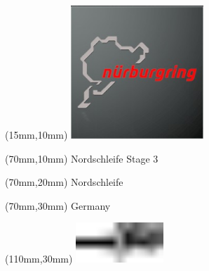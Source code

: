 \null\newpage
\begin{textblock*}{50mm}(15mm,10mm)%
\includegraphics[width=50mm]{LG/2015-05-20_00088.png}
\end{textblock*}
\begin{textblock*}{130mm}(70mm,10mm)%
{\fontsize{20}{20}\selectfont Nordschleife Stage 3}\\
\end{textblock*}
\begin{textblock*}{120mm}(70mm,20mm)%
{\fontsize{16}{16}\selectfont Nordschleife}\\
\end{textblock*}
\begin{textblock*}{120mm}(70mm,30mm)%
{\fontsize{12}{12}\selectfont Germany}
\end{textblock*}
\begin{textblock*}{30mm}(110mm,30mm)%
\centering
\includegraphics[height=15mm]{icons/tofinish.pdf}
\end{textblock*}
